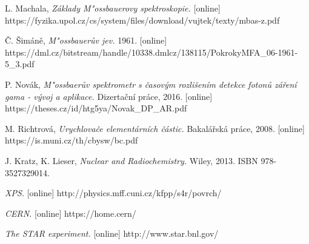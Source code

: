 \documentclass[12pt]{book}
\begin{document}
\begin{thebibliography}{1}
 L. Machala, \textit{Základy M"ossbauerovy spektroskopie.} [online] \\https://fyzika.upol.cz/cs/system/files/download/vujtek/texty/mbas-z.pdf

 Č. Šimáně, \textit{M"ossbauerův jev.} 1961. [online] \\https://dml.cz/bitstream/handle/10338.dmlcz/138115/PokrokyMFA\_06-1961-5\_3.pdf

 P. Novák, \textit{M"ossbaerův spektrometr s časovým rozlišením detekce fotonů záření gama - vývoj a aplikace.} Dizertační práce, 2016. [online] https://theses.cz/id/htg5ya/Novak\_DP\_AR.pdf

 M. Richtrová, \textit{Urychlovače elementárních částic.} Bakalářská práce, 2008. [online] \\https://is.muni.cz/th/cbysw/bc.pdf

 J. Kratz, K. Lieser, \textit{Nuclear and Radiochemistry.} Wiley, 2013. ISBN 978-3527329014.


 \textit{XPS.} [online] http://physics.mff.cuni.cz/kfpp/s4r/povrch/

 \textit{CERN.} [online] https://home.cern/

 \textit{The STAR experiment.} [online] http://www.star.bnl.gov/

\end{thebibliography}
\end{document}
